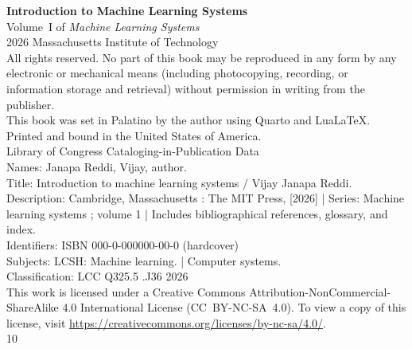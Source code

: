 \null\vfill
\begin{flushleft}
\thispagestyle{empty}

{\large\bfseries Introduction to Machine Learning Systems}\\[0.5em]
{\normalsize Volume~I of \textit{Machine Learning Systems}}\\[1.5em]

\textcopyright{} 2026 Massachusetts Institute of Technology\\[0.5em]

All rights reserved. No part of this book may be reproduced in any form by any electronic or mechanical means (including photocopying, recording, or information storage and retrieval) without permission in writing from the publisher.\\[1em]

This book was set in Palatino by the author using Quarto and Lua\LaTeX.\\[0.5em]

Printed and bound in the United States of America.\\[1em]

Library of Congress Cataloging-in-Publication Data\\[0.25em]
Names: Janapa Reddi, Vijay, author.\\
Title: Introduction to machine learning systems / Vijay Janapa Reddi.\\
Description: Cambridge, Massachusetts : The MIT Press, [2026] | Series: Machine learning systems ; volume 1 | Includes bibliographical references, glossary, and index.\\
Identifiers: ISBN 000-0-000000-00-0 (hardcover)\\
Subjects: LCSH: Machine learning. | Computer systems.\\
Classification: LCC Q325.5 .J36 2026\\[1em]

This work is licensed under a Creative Commons Attribution-NonCommercial-ShareAlike 4.0 International License (CC~BY-NC-SA~4.0). To view a copy of this license, visit \url{https://creativecommons.org/licenses/by-nc-sa/4.0/}.\\[1em]

10

\end{flushleft}
